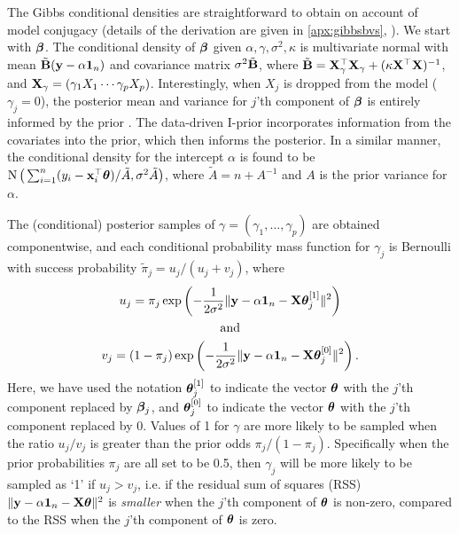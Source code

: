 \documentclass[11pt,twoside,openright]{report}
\begin{document}
The Gibbs conditional densities are straightforward to obtain on account of model conjugacy (details of the derivation are given in \cref{apx:gibbsbvs}, ).
We start with ${\bm\beta}$. 
The conditional density of ${\bm\beta}$ given $\alpha,\gamma,\sigma^2,\kappa$ is multivariate normal with mean $\tilde {{\mathbf B}}({\mathbf y}-\alpha{\mathbf 1}_n)$ and covariance matrix $\sigma^2\tilde {{\mathbf B}}$, where $\tilde {{\mathbf B}} = {\mathbf X}_\gamma^\top {\mathbf X}_\gamma + (\kappa \mathbf X^\top \mathbf X)^{-1}$, and ${\mathbf X}_\gamma = (\gamma_1X_1 \cdots \gamma_pX_p)$.
Interestingly, when $X_j$ is dropped from the model ($\gamma_j=0$), the posterior mean and variance for $j$'th component of ${\bm\beta}$ is entirely informed by the prior \citep{Kuo1998}.
The data-driven I-prior incorporates information from the covariates into the prior, which then informs the posterior.
In a similar manner, the conditional density for the intercept $\alpha$ is found to be $\operatorname{N}\big( \sum_{i=1}^n(y_i - {\mathbf x}_i^\top{\bm\theta}) / \tilde A,\sigma^2\tilde A \big)$, where $\tilde A = n + A^{-1}$ and $A$ is the prior variance for $\alpha$.

The (conditional) posterior samples of $\gamma=(\gamma_1,\dots,\gamma_p)$ are obtained componentwise, and each conditional probability mass function for $\gamma_j$ is Bernoulli  with success probability $\tilde \pi_j = u_j / (u_j + v_j)$, where
\begin{align*}
  \begin{gathered}
    u_j = \pi_j \exp\left( - \frac{1}{2\sigma^2} \Vert {\mathbf y} - \alpha {\mathbf 1}_n - {\mathbf X}{\bm\theta}_j^{[1]} \Vert^2 \right) \\
    \text{and} \\
    v_j = (1-\pi_j) \exp\left( - \frac{1}{2\sigma^2} \Vert {\mathbf y} - \alpha {\mathbf 1}_n - {\mathbf X}{\bm\theta}_j^{[0]} \Vert^2 \right).
  \end{gathered}
\end{align*}
Here, we have used the notation ${\bm\theta}_j^{[1]}$ to indicate the vector ${\bm\theta}$ with the $j$'th component replaced by ${\bm\beta}_j$, and ${\bm\theta}_j^{[0]}$ to indicate the vector ${\bm\theta}$ with the $j$'th component replaced by 0.
Values of 1 for $\gamma$ are more likely to be sampled when the ratio $u_j / v_j$ is greater than the prior odds $\pi_j/(1-\pi_j)$.
Specifically when the prior probabilities $\pi_j$ are all set to be 0.5, then $\gamma_j$ will be more likely to be sampled as `1' if $u_j > v_j$, i.e. if the residual sum of squares (RSS) $\Vert {\mathbf y} - \alpha{\mathbf 1}_n - {\mathbf X}{\bm\theta} \Vert^2$ is \emph{smaller} when the $j$'th component of ${\bm\theta}$ is non-zero, compared to the RSS when the $j$'th component of ${\bm\theta}$ is zero.
\end{document}
